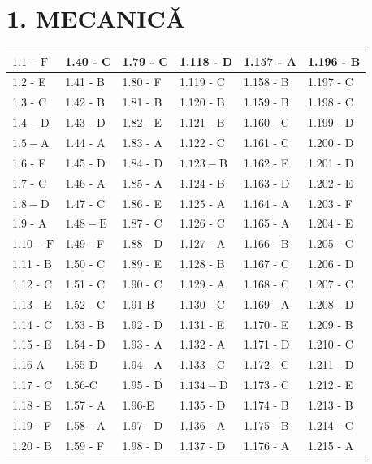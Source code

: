 \documentclass[10pt]{article}
\begin{document}
\section*{1. MECANICĂ}
\begin{center}
\begin{tabular}{|l|l|l|l|l|l|}
\hline
$1.1-\mathrm{F}$ & 1.40 - C & 1.79 - C & 1.118 - D & 1.157 - A & 1.196 - B \\
\hline
1.2 - E & 1.41 - B & 1.80 - F & 1.119 - C & 1.158 - B & 1.197 - C \\
\hline
1.3 - C & 1.42 - B & 1.81 - B & 1.120 - B & 1.159 - B & 1.198 - C \\
\hline
$1.4-\mathrm{D}$ & 1.43 - D & 1.82 - E & 1.121 - B & 1.160 - C & 1.199 - D \\
\hline
$1.5-\mathrm{A}$ & 1.44 - A & 1.83 - A & 1.122 - C & 1.161 - C & 1.200 - D \\
\hline
1.6 - E & 1.45 - D & 1.84 - D & $1.123-\mathrm{B}$ & 1.162 - E & 1.201 - D \\
\hline
1.7 - C & 1.46 - A & 1.85 - A & 1.124 - B & 1.163 - D & 1.202 - E \\
\hline
$1.8-\mathrm{D}$ & 1.47 - C & 1.86 - E & 1.125 - A & 1.164 - A & 1.203 - F \\
\hline
1.9 - A & $1.48-\mathrm{E}$ & 1.87 - C & 1.126 - C & 1.165 - A & 1.204 - E \\
\hline
$1.10-\mathrm{F}$ & 1.49 - F & 1.88 - D & 1.127 - A & 1.166 - B & 1.205 - C \\
\hline
1.11 - B & 1.50 - C & 1.89 - E & 1.128 - B & 1.167 - C & 1.206 - D \\
\hline
1.12 - C & 1.51 - C & 1.90 - C & 1.129 - A & 1.168 - C & 1.207 - C \\
\hline
1.13 - E & 1.52 - C & 1.91-B & 1.130 - C & 1.169 - A & 1.208 - D \\
\hline
1.14 - C & 1.53 - B & 1.92 - D & 1.131 - E & 1.170 - E & 1.209 - B \\
\hline
1.15 - E & 1.54 - D & 1.93 - A & 1.132 - A & 1.171 - D & 1.210 - C \\
\hline
1.16-A & 1.55-D & 1.94 - A & 1.133 - C & 1.172 - C & 1.211 - D \\
\hline
1.17 - C & 1.56-C & 1.95 - D & $1.134-\mathrm{D}$ & 1.173 - C & 1.212 - E \\
\hline
1.18 - E & 1.57 - A & 1.96-E & 1.135 - D & 1.174 - B & 1.213 - B \\
\hline
1.19 - F & 1.58 - A & 1.97 - D & 1.136 - A & 1.175 - B & 1.214 - C \\
\hline
1.20 - B & 1.59 - F & 1.98 - D & 1.137 - D & 1.176 - A & 1.215 - A \\

\end{tabular}
\end{center}
\end{document}
